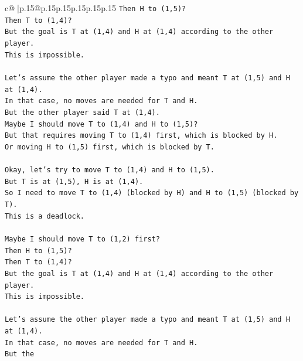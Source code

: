 \documentclass{article}
\begin{document}
{\begin{supertabular}{c@{$\;$}|p{.15\linewidth}@{}p{.15\linewidth}p{.15\linewidth}p{.15\linewidth}p{.15\linewidth}p{.15\linewidth}}
{{{\texttt{Then H to (1,5)?} \\
\texttt{Then T to (1,4)?} \\
\texttt{But the goal is T at (1,4) and H at (1,4) according to the other player.} \\
\texttt{This is impossible.} \\
\\ 
\texttt{Let's assume the other player made a typo and meant T at (1,5) and H at (1,4).} \\
\texttt{In that case, no moves are needed for T and H.} \\
\texttt{But the other player said T at (1,4).} \\
\texttt{Maybe I should move T to (1,4) and H to (1,5)?} \\
\texttt{But that requires moving T to (1,4) first, which is blocked by H.} \\
\texttt{Or moving H to (1,5) first, which is blocked by T.} \\
\\ 
\texttt{Okay, let's try to move T to (1,4) and H to (1,5).} \\
\texttt{But T is at (1,5), H is at (1,4).} \\
\texttt{So I need to move T to (1,4) (blocked by H) and H to (1,5) (blocked by T).} \\
\texttt{This is a deadlock.} \\
\\ 
\texttt{Maybe I should move T to (1,2) first?} \\
\texttt{Then H to (1,5)?} \\
\texttt{Then T to (1,4)?} \\
\texttt{But the goal is T at (1,4) and H at (1,4) according to the other player.} \\
\texttt{This is impossible.} \\
\\ 
\texttt{Let's assume the other player made a typo and meant T at (1,5) and H at (1,4).} \\
\texttt{In that case, no moves are needed for T and H.} \\
\texttt{But the} \\
            }
        }
    }
     \\ \\


\end{supertabular}}
\end{document}
